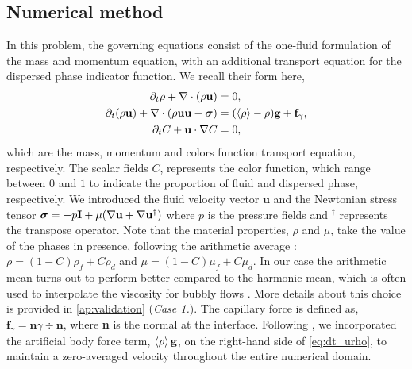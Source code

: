 \subsection{Numerical method}

In this problem, the governing equations consist of the one-fluid formulation of the mass and momentum equation, with an additional transport equation for the dispersed phase indicator function. 
We recall their form here, 
\begin{align}
    \partial_t \rho+ \mathbf{\nabla}\cdot(\rho\textbf{u})
    &= 0,\\
    \label{eq:dt_urho}
    \partial_t (\rho \textbf{u})
    + \mathbf{\nabla}\cdot (\rho  \textbf{u} \textbf{u} - \bm\sigma)
    &= (\left<\rho\right> - \rho)\textbf{g}
    + \textbf{f}_\gamma,\\
    \label{eq:dt_C}
    \partial_t C + \textbf{u}\cdot\mathbf{\nabla} C  
    &= 0,
\end{align}
which are the mass, momentum and colors function transport equation, respectively. 
The scalar fields $C$, represents the color function, which range between $0$ and $1$ to indicate the proportion of fluid and dispersed phase, respectively. 
We introduced the fluid velocity vector $\textbf{u}$ and the Newtonian stress tensor $\bm{\sigma} = -p \textbf{I} + \mu (\mathbf{\nabla} \textbf{u}+ \mathbf{\nabla} \textbf{u}^\dagger)$ where $p$ is the pressure fields and $^\dagger$ represents the transpose operator.
Note that the material properties, $\rho$ and $\mu$, take the value of the phases in presence, following the arithmetic average : $\rho = (1-C)\rho_f + C \rho_d$ and $\mu = (1-C)\mu_f + C \mu_d$. 
In our case the arithmetic mean turns out to perform better compared to the harmonic mean, which is often used to interpolate the viscosity for bubbly flows \citet{hidman2023assessing,innocenti2020direct}.
More details about this choice is provided in \ref{ap:validation} (\textit{Case 1.}). 
The capillary force is defined as, $\textbf{f}_\gamma =\textbf{n} \gamma \div \textbf{n} $, where \textbf{n} is the normal at the interface.
Following  \citep{bunner2002dynamics}, we incorporated the artificial body force term, $\left<\rho\right>\textbf{g}$, on the right-hand side of \ref{eq:dt_urho}, to maintain a zero-averaged velocity throughout the entire numerical domain.  

